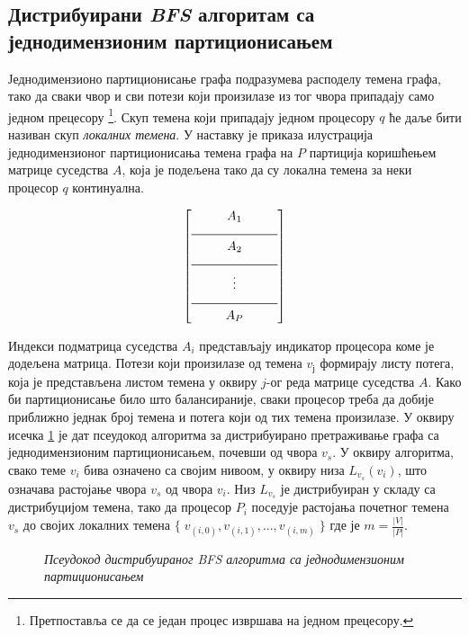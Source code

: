 \subsection{Дистрибуирани \textit{BFS} алгоритам са једнодимензионим партиционисањем}
Једнодимензионо партиционисање графа подразумева расподелу темена графа, тако да сваки чвор и сви потези који произилазе из тог чвора припадају само једном прецесору \footnote{Претпоставља се да се један процес извршава на једном прецесору.\label{1p-1P}}. Скуп темена који припадају једном процесору $q$ ће даље бити називан скуп \textit{локалних темена}. У наставку је приказа илустрација једнодимензионог партиционисања темена графа на $P$ партиција коришћењем матрице суседства $A$, која је подељена тако да су локална темена за неки процесор $q$ континуална.

\[
\begin{bmatrix}
A_1 \\
\noindent\rule{0.2\linewidth}{0.5pt} \\
A_2 \\
\noindent\rule{0.2\linewidth}{0.5pt} \\
\vdots \\
\noindent\rule{0.2\linewidth}{0.5pt} \\
A_P \\
\end{bmatrix}
\]

\par
Индекси подматрица суседства $A_i$ представљају индикатор процесора коме је додељена матрица. Потези који произилазе од темена $v_ј$ формирају листу потега, која је представљена листом темена у оквиру $j$-ог реда матрице суседства $A$. Како би партиционисање било што балансираније, сваки процесор треба да добије приближно једнак број темена и потега који од тих темена произилазе. У оквиру исечка \ref{pseudocode:algorithm-bfs-distance-1D-par-pseudo} је дат псеудокод алгоритма за дистрибуирано претраживање графа са једнодимензионим партиционисањем, почевши од чвора $v_s$. У оквиру алгоритма, свако теме $v_i$ бива означено са својим нивоом, у оквиру низа $L_{v_s}(v_i)$, што означава растојање чвора $v_s$ од чвора $v_i$. Низ $L_{v_s}$ је дистрибуиран у складу са дистрибуцијом темена, тако да процесор $P_i$ поседује растојања почетног темена $v_s$ до својих локалних темена $\{ \; v_{(i, 0)}, v_{(i, 1)}, ..., v_{(i, m)} \; \}$ где је $m = \frac{|V|}{|P|}$.

\begin{figure}[!ht]
    \centering
    
    \caption{\textit{Псеудокод дистрибуираног BFS алгоритма са једнодимензионим партиционисањем}}
    \label{pseudocode:algorithm-bfs-distance-1D-par-pseudo}
\end{figure}

